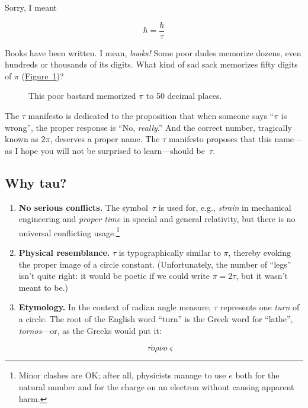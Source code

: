 \documentclass{article}
\begin{document}
Sorry, I meant

\[ \hbar = \frac{h}{\tau} \]


Books have been written. I mean, \emph{books!} Some poor dudes memorize dozens, even hundreds or thousands of its digits. What kind of sad sack memorizes fifty digits of $\pi$ (\hyperref[fig:michael_hartl]{Figure~}\ref{fig:michael_hartl})?

\begin{figure}
\begin{center}
\end{center}
\caption{This poor bastard memorized $\pi$ to 50 decimal places.\label{fig:michael_hartl}}
\end{figure}


The $\tau$ manifesto is dedicated to the proposition that when someone says ``$\pi$ is wrong'', the proper response is ``No, \emph{really}.'' And the correct number, tragically known as $2\pi$, deserves a proper name. The $\tau$ manifesto proposes that this name---as I hope you will not be surprised to learn---should be~$\tau$.

  \subsection{Why tau?} %
  \label{sec:why_tau}
  

\begin{enumerate}
  \item \textbf{No serious conflicts.} The symbol~$\tau$ is used for, e.g., \emph{strain} in mechanical engineering and \emph{proper time} in special and general relativity, but there is no universal conflicting usage.\footnote{Minor clashes are OK; after all, physicists manage to use $e$ both for the natural number and for the charge on an electron without causing apparent harm.} 
  
  \item \textbf{Physical resemblance.} $\tau$ is typographically similar to $\pi$, thereby evoking the proper image of a circle constant. (Unfortunately, the number of ``legs'' isn't quite right: it would be poetic if we could write $\pi = 2\tau$, but it wasn't meant to be.)
  
  \item \textbf{Etymology.} In the context of radian angle measure, $\tau$ represents one \emph{turn} of a circle. The root of the English word ``turn'' is the Greek word for ``lathe'', \emph{tornos}---or, as the Greeks would put it: 
  
\[ \tau \acute{o}\rho\nu o\varsigma \]
  
\end{enumerate}
\end{document}

